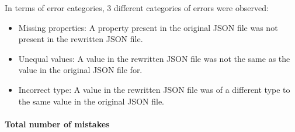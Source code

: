 \documentclass{l4proj}
\begin{document}
In terms of error categories, 3 different categories of errors were observed:
\begin{itemize}
    \item Missing properties: A property present in the original JSON file was not present in the rewritten JSON file.
    \item Unequal values: A value in the rewritten JSON file was not the same as the value in the original JSON file for.
    \item Incorrect type: A value in the rewritten JSON file was of a different type to the same value in the original JSON file. 
\end{itemize}

\paragraph{Total number of mistakes}\hfill
\end{document}
